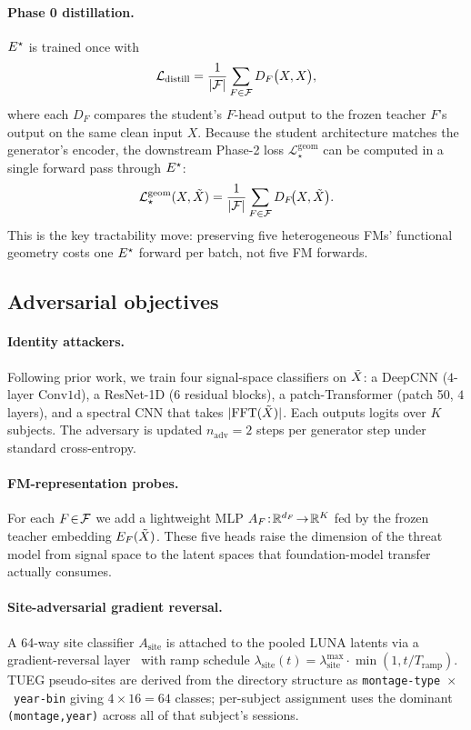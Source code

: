 \paragraph{Phase 0 distillation.} $E^{\star}$ is trained once with
\begin{equation}
\mathcal{L}_{\text{distill}} = \frac{1}{|\mathcal{F}|}\sum_{F\in\mathcal{F}} D_F\bigl(X, X\bigr),
\label{eq:distill}
\end{equation}
where each $D_F$ compares the student's $F$-head output to the frozen teacher $F$'s output on the same clean input $X$. Because the student architecture matches the generator's encoder, the downstream Phase-2 loss $\mathcal{L}_\star^{\text{geom}}$ can be computed in a single forward pass through $E^{\star}$:
\begin{equation}
\mathcal{L}_\star^{\text{geom}}(X,\tilde{X}) = \frac{1}{|\mathcal{F}|}\sum_{F\in\mathcal{F}} D_F\!\bigl(X, \tilde{X}\bigr).
\label{eq:geom_loss}
\end{equation}
This is the key tractability move: preserving five heterogeneous FMs' functional geometry costs one $E^{\star}$ forward per batch, not five FM forwards.

\subsection{Adversarial objectives}
\label{sec:adversary}

\paragraph{Identity attackers.} Following prior work, we train four signal-space classifiers on $\tilde{X}$: a DeepCNN ($4$-layer $\mathrm{Conv1d}$), a ResNet-1D ($6$ residual blocks), a patch-Transformer (patch 50, $4$ layers), and a spectral CNN that takes $|\mathrm{FFT}(\tilde{X})|$. Each outputs logits over $K$ subjects. The adversary is updated $n_{\text{adv}}\!=\!2$ steps per generator step under standard cross-entropy.

\paragraph{FM-representation probes.} For each $F\!\in\!\mathcal{F}$ we add a lightweight MLP $A_F\!:\!\mathbb{R}^{d_F}\!\to\!\mathbb{R}^{K}$ fed by the frozen teacher embedding $E_F(\tilde{X})$. These five heads raise the dimension of the threat model from signal space to the latent spaces that foundation-model transfer actually consumes.

\paragraph{Site-adversarial gradient reversal.} A 64-way site classifier $A_{\text{site}}$ is attached to the pooled LUNA latents via a gradient-reversal layer~\citep{ganin2015_dann} with ramp schedule $\lambda_{\text{site}}(t) \!=\! \lambda_{\text{site}}^{\max}\cdot\min(1,t/T_{\text{ramp}})$. TUEG pseudo-sites are derived from the directory structure as \texttt{montage-type}~$\times$~\texttt{year-bin} giving $4\!\times\!16\!=\!64$ classes; per-subject assignment uses the dominant \texttt{(montage,year)} across all of that subject's sessions.

